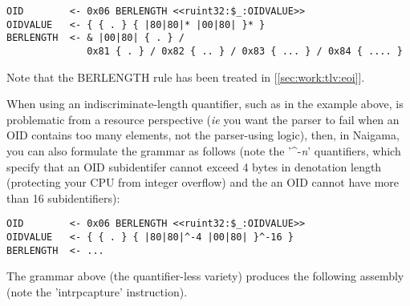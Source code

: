 
\begin{changemargin}{-60mm}{0mm}
\begin{myquote}
\begin{verbatim}
OID        <- 0x06 BERLENGTH <<ruint32:$_:OIDVALUE>>
OIDVALUE   <- { { . } { |80|80|* |00|80| }* }
BERLENGTH  <- & |00|80| { . } /
              0x81 { . } / 0x82 { .. } / 0x83 { ... } / 0x84 { .... }
\end{verbatim}
\end{myquote}
\end{changemargin}

Note that the BERLENGTH rule has been treated in [\ref{sec:work:tlv:eoi}].


When using an indiscriminate-length quantifier, such as in the example
above, is problematic from a resource perspective (\textit{ie} you
want the parser to fail when an OID contains too many elements, not
the parser-using logic), then, in Naigama, you can also formulate the
grammar as follows (note the '\^{}-\textit{n}' quantifiers, which specify
that an OID subidentifer cannot exceed 4 bytes in denotation length
(protecting your CPU from integer overflow) and the an OID cannot have
more than 16 subidentifiers):

\begin{changemargin}{-60mm}{0mm}
\begin{myquote}
\begin{verbatim}
OID        <- 0x06 BERLENGTH <<ruint32:$_:OIDVALUE>>
OIDVALUE   <- { { . } { |80|80|^-4 |00|80| }^-16 }
BERLENGTH  <- ...
\end{verbatim}
\end{myquote}
\end{changemargin}


The grammar above (the quantifier-less variety) produces the following assembly
(note the 'intrpcapture' instruction).

